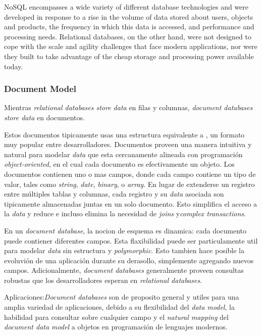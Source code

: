 NoSQL encompasses a wide variety of different database technologies and were developed in response to a rise in the volume of data stored about users, objects and products, the frequency in which this data is accessed, and performance and processing needs. Relational databases, on the other hand, were not designed to cope with the scale and agility challenges that face modern applications, nor were they built to take advantage of the cheap storage and processing power available today.

\subsubsection*{Document Model}
 Mientras \textit{relational databases store data} en filas y columnas, \textit{document databases store data} en documentos.  

Estos documentos tipicamente usas una estructura equivalente a , un formato muy popular entre desarrolladores. Documentos proveen una manera intuitiva y natural para modelar \textit{data} que esta cercanamente alineada con  programación \textit{object-oriented}, en el cual cada documento es efectivamente un objeto. Los documentos contienen uno o mas campos, donde cada campo contiene un tipo de valor, tales como \textit{string}, \textit{date}, \textit{binary}, o \textit{array}. En lugar de extenderse un registro entre múltiples tablas y columnas, cada registro y su \textit{data} asociada son tipicamente almacenadas juntas en un solo documento. Esto simplifica el acceso a la \textit{data} y reduce e incluso elimina la necesidad de \textit{joins} y\textit{complex transactions}.

En un \textit{document database}, la nocion de esquema es dinamica: cada documento puede contiener diferentes campos. Esta flaxibilidad puede ser particulamente util para modelar \textit{data} sin estructura y \textit{polymorphic}. Esto tambien hace posible la evoluvión de una aplicación durante su derasollo, simplemente agregando nuevos campos. Adicionalmente, \textit{document databases} generalmente proveen consultas robustas que los desarrolladores esperan en \textit{relational databases}.

Aplicaciones:\textit{Document databases} son de proposito general y utiles para una amplia variedad de aplicaciones, debido a su flexibilidad del \textit{data model}, la habilidad para consultar sobre cualquier campo y el \textit{natural mapping} del \textit{document data model} a objetos en programación de lenguajes modernos.

